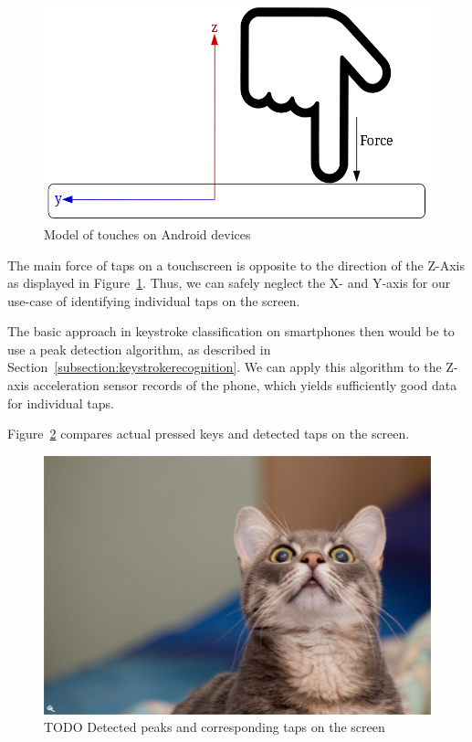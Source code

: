 \begin{figure}
    \centering
    \includegraphics[width=\textwidth]{figures/TapDirection.png}
    \caption{Model of touches on Android devices}
    \label{fig:touchdirection}
\end{figure}
The main force of taps on a touchscreen is opposite to the direction of the Z-Axis as displayed in Figure~\ref{fig:touchdirection}. Thus, we can safely neglect the X- and Y-axis for our use-case of identifying individual taps on the screen.

The basic approach in keystroke classification on smartphones then would be to use a peak detection algorithm, as described in Section~\ref{subsection:keystrokerecognition}. We can apply this algorithm to the Z-axis acceleration sensor records of the phone, which yields sufficiently good data for individual taps.

Figure~\ref{fig:taprecognition} compares actual pressed keys and detected taps on the screen.

\begin{figure}
    \centering
    \includegraphics[width=0.8\linewidth]{figures/lucifero_lolcat_by_fraterorion-d4q5ol0.jpg}
    \caption{TODO Detected peaks and corresponding taps on the screen}
    \label{fig:taprecognition}
\end{figure}

